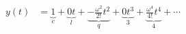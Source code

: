 \documentclass[preview]{standalone}
\begin{document}
\begin{align*}
y(t) &= \underbrace{1}_{c} + \underbrace{0t}_{l} + \underbrace{-\frac{\omega^2}{2!}t^2}_{q} + \underbrace{0t^3}_{3} + \underbrace{\frac{\omega^4}{4!}t^4}_{4} + \cdots
\end{align*}
\end{document}
